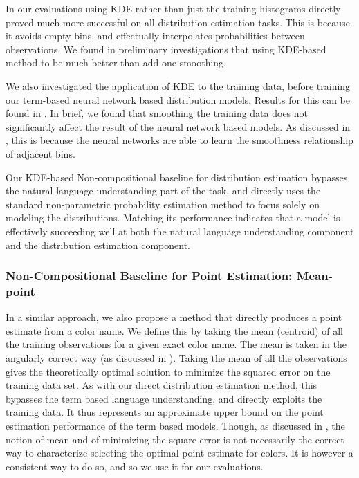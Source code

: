 \documentclass[]{clv3}
\newcommand{\empmodel}{Non-compositional baseline} %
\begin{document}
In our evaluations using KDE rather than just the training histograms directly proved much more successful on all distribution estimation tasks.
This is because it avoids empty bins, and effectually interpolates probabilities between observations.
We found in preliminary investigations that using KDE-based method to be much better than add-one smoothing.

We also investigated the application of KDE to the training data,  before training our term-based neural network based distribution models.
Results for this can be found in .
In brief, we found that smoothing the training data does not significantly affect the result of the neural network based models.
As discussed in , this is because the neural networks are able to learn the smoothness relationship of adjacent bins.


Our KDE-based \empmodel{} for distribution estimation bypasses the natural language understanding part of the task,
and directly uses the standard non-parametric probability estimation method to focus solely on modeling the distributions.
Matching its performance indicates that a model is effectively succeeding well at both the natural language understanding component and the distribution estimation component.


\subsubsection{Non-Compositional Baseline for Point Estimation: Mean-point}
In a similar approach, we also propose a method that directly produces a point estimate from a color name.
We define this by taking the mean (centroid) of all the training observations for a given exact color name.
The mean is taken in the angularly correct way (as discussed in ).
Taking the mean of all the observations gives the theoretically optimal solution to minimize the squared error on the training data set.
As with our direct distribution estimation method, this bypasses the term based language understanding, and directly exploits the training data.
It thus represents an approximate upper bound on the point estimation performance of the term based models.
Though, as discussed in , the notion of mean and of minimizing the square error is not necessarily the correct way to characterize selecting the optimal point estimate for colors.
It is however a consistent way to do so, and so we use it for our evaluations.
\end{document}
